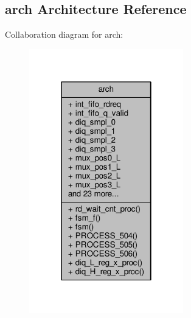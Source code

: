 \subsection{arch Architecture Reference}
\label{classtxiq_1_1arch}


Collaboration diagram for arch\+:\nopagebreak
\begin{figure}[H]
\begin{center}
\leavevmode
\includegraphics[width=190pt]{d6/d4d/classtxiq_1_1arch__coll__graph}
\end{center}
\end{figure}
